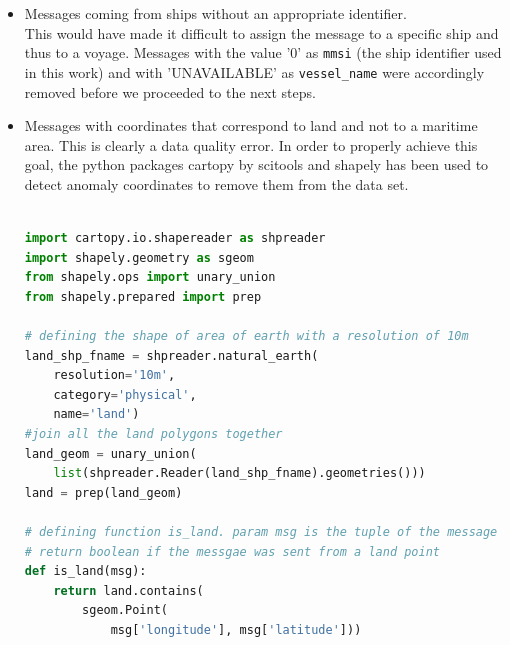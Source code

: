     \begin{itemize}
        \item Messages coming from ships without an appropriate identifier.
        \\
        This would have made it difficult to assign the message to a specific ship and thus to a voyage. Messages with the value '0' as \verb|mmsi| (the ship identifier used in this work) and with 'UNAVAILABLE' as \verb|vessel_name| were accordingly removed before we proceeded to the next steps.
        
        \item Messages with coordinates that correspond to land and not to a maritime area.
        This is clearly a data quality error. In order to properly achieve this goal, the python packages cartopy \cite{cartopy} by scitools and shapely \cite{shapely} has been used to detect anomaly coordinates to remove them from the data set.
        
        \begin{minipage}{\linewidth}
        \begin{lstlisting}[language=Python]

import cartopy.io.shapereader as shpreader
import shapely.geometry as sgeom
from shapely.ops import unary_union
from shapely.prepared import prep

# defining the shape of area of earth with a resolution of 10m
land_shp_fname = shpreader.natural_earth(
    resolution='10m', 
    category='physical', 
    name='land')
#join all the land polygons together
land_geom = unary_union(
    list(shpreader.Reader(land_shp_fname).geometries()))
land = prep(land_geom)

# defining function is_land. param msg is the tuple of the message
# return boolean if the messgae was sent from a land point
def is_land(msg):
    return land.contains(
        sgeom.Point(
            msg['longitude'], msg['latitude']))
    
        \end{lstlisting}
        \end{minipage}
        

\end{itemize}

